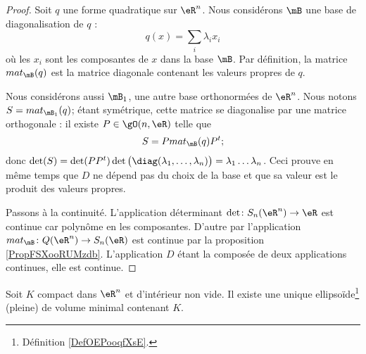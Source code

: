 \begin{proof}
    Soit \( q\) une forme quadratique sur \( \eR^n\). Nous considérons \( \mB\) une base de diagonalisation de \( q\) :
    \begin{equation}
        q(x)=\sum_i\lambda_ix_i
    \end{equation}
    où les \( x_i\) sont les composantes de \( x\) dans la base \( \mB\). Par définition, la matrice \( mat_{\mB}(q)\) est la matrice diagonale contenant les valeurs propres de \( q\).

    Nous considérons aussi \( \mB_1\), une autre base orthonormées de \( \eR^n\). Nous notons \( S=mat_{\mB_1}(q)\); étant symétrique, cette matrice se diagonalise par une matrice orthogonale : il existe \( P\in\gO(n,\eR)\) telle que
    \begin{equation}
        S=P mat_{\mB}(q)P^t;
    \end{equation}
    donc \( \det(S)=\det(PP^t)\det\big( \diag(\lambda_1,\ldots, \lambda_n) \big)=\lambda_1\ldots\lambda_n\). Ceci prouve en même temps que \( D\) ne dépend pas du choix de la base et que sa valeur est le produit des valeurs propres.

    Passons à la continuité. L'application déterminant \( \det\colon S_n(\eR^n)\to \eR\) est continue car polynôme en les composantes. D'autre par l'application \( mat_{\mB}\colon Q(\eR^n)\to S_n(\eR)\) est continue par la proposition \ref{PropFSXooRUMzdb}. L'application  \( D\) étant la composée de deux applications continues, elle est continue.
\end{proof}

\begin{proposition}   \label{PropJYVooRMaPok}
    Soit \( K\) compact dans \( \eR^n\) et d'intérieur non vide. Il existe une unique ellipsoïde\footnote{Définition \ref{DefOEPooqfXsE}.} (pleine) de volume minimal contenant \( K\).
\end{proposition}

